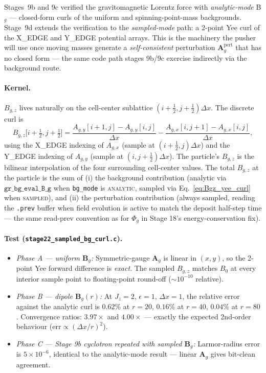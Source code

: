 \documentclass[11pt,a4paper]{article}
\newcommand{\vv}[1]{\mathbf{#1}}
\newcommand{\Phig}{\Phi_g}
\newcommand{\Ag}{\vv{A}_g}
\begin{document}
Stages~9b and 9c verified the gravitomagnetic Lorentz force with
\emph{analytic-mode} B$_g$ — closed-form curls of the uniform and
spinning-point-mass backgrounds.  Stage~9d extends the verification to
the \emph{sampled-mode} path: a 2-point Yee curl of the
\textsc{X\_EDGE} and \textsc{Y\_EDGE} potential arrays.  This is the
machinery the pusher will use once moving masses generate a
\emph{self-consistent} perturbation $\Ag^{\mathrm{pert}}$ that has no
closed form — the same code path stages 9b/9c exercise indirectly via
the background route.

\paragraph{Kernel.}  $B_{g,z}$ lives naturally on the cell-center
sublattice $(i+\tfrac12, j+\tfrac12)\Delta x$.  The discrete curl is
\begin{equation}
\label{eq:Bgz_yee_curl}
  B_{g,z}\bigl[i+\tfrac12, j+\tfrac12\bigr]
  = \frac{A_{g,y}[i+1, j] - A_{g,y}[i, j]}{\Delta x}
  - \frac{A_{g,x}[i, j+1] - A_{g,x}[i, j]}{\Delta x},
\end{equation}
using the X\_EDGE indexing of $A_{g,x}$ (sample at $(i+\tfrac12, j)\Delta x$)
and the Y\_EDGE indexing of $A_{g,y}$ (sample at $(i, j+\tfrac12)\Delta x$).
The particle's $B_{g,z}$ is the bilinear interpolation of the four
surrounding cell-center values.  The total $B_{g,z}$ at the particle
is the sum of (i) the background contribution
(analytic via $\texttt{gr\_bg\_eval\_B\_g}$ when \texttt{bg\_mode} is
\textsc{analytic}, sampled via Eq.~\ref{eq:Bgz_yee_curl} when
\textsc{sampled}), and (ii) the perturbation contribution (always
sampled, reading the \texttt{.prev} buffer when field evolution is
active to match the deposit half-step time --- the same read-prev
convention as for $\Phig$ in Stage 18's energy-conservation fix).

\paragraph{Test (\texttt{stage22\_sampled\_bg\_curl.c}).}
\begin{itemize}
  \item \emph{Phase A — uniform $\vv{B}_g$:}  Symmetric-gauge
    $\Ag$ is linear in $(x, y)$, so the 2-point Yee forward
    difference is \emph{exact}.  The sampled $B_{g,z}$ matches
    $B_0$ at every interior sample point to floating-point round-off
    ($\sim 10^{-10}$ relative).
  \item \emph{Phase B — dipole $\vv{B}_g(r)$:}  At
    $J_z = 2$, $\epsilon = 1$, $\Delta x = 1$, the relative error
    against the analytic curl is $0.62\%$ at $r=20$, $0.16\%$ at $r=40$,
    $0.04\%$ at $r=80$.  Convergence ratios: $3.97\times$ and $4.00\times$
    --- exactly the expected 2nd-order behaviour
    ($\mathrm{err} \propto (\Delta x/r)^2$).
  \item \emph{Phase C — Stage 9b cyclotron repeated with sampled
    $\vv{B}_g$:}  Larmor-radius error is $5\times 10^{-6}$, identical
    to the analytic-mode result --- linear $\Ag$ gives bit-clean
    agreement.
\end{itemize}
\end{document}

